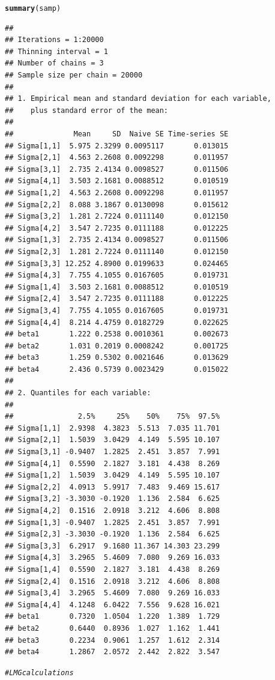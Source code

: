 \documentclass[11pt,a4paper,twoside]{book}\usepackage[]{graphicx}\usepackage[]{color}
\makeatletter
\newcommand{\hlcom}[1]{\textcolor[rgb]{0.678,0.584,0.686}{\textit{#1}}}%
\newcommand{\hlstd}[1]{\textcolor[rgb]{0.345,0.345,0.345}{#1}}%
\newcommand{\hlkwd}[1]{\textcolor[rgb]{0.737,0.353,0.396}{\textbf{#1}}}%
\newenvironment{kframe}{%
 \def\at@end@of@kframe{}%
 \ifinner\ifhmode%
  \def\at@end@of@kframe{\end{minipage}}%
  \begin{minipage}{\columnwidth}%
 \fi\fi%
 \def\FrameCommand##1{\hskip\@totalleftmargin \hskip-\fboxsep
 \colorbox{shadecolor}{##1}\hskip-\fboxsep
     \hskip-\linewidth \hskip-\@totalleftmargin \hskip\columnwidth}%
 \MakeFramed {\advance\hsize-\width
   \@totalleftmargin\z@ \linewidth\hsize
   \@setminipage}}%
 {\par\unskip\endMakeFramed%
 \at@end@of@kframe}
\newenvironment{knitrout}{}{} %
\makeatother
\begin{document}
\begin{knitrout}
\begin{kframe}
\begin{alltt}
\hlkwd{summary}\hlstd{(samp)}
\end{alltt}
\begin{verbatim}
## 
## Iterations = 1:20000
## Thinning interval = 1 
## Number of chains = 3 
## Sample size per chain = 20000 
## 
## 1. Empirical mean and standard deviation for each variable,
##    plus standard error of the mean:
## 
##              Mean     SD  Naive SE Time-series SE
## Sigma[1,1]  5.975 2.3299 0.0095117       0.013015
## Sigma[2,1]  4.563 2.2608 0.0092298       0.011957
## Sigma[3,1]  2.735 2.4134 0.0098527       0.011506
## Sigma[4,1]  3.503 2.1681 0.0088512       0.010519
## Sigma[1,2]  4.563 2.2608 0.0092298       0.011957
## Sigma[2,2]  8.088 3.1867 0.0130098       0.015612
## Sigma[3,2]  1.281 2.7224 0.0111140       0.012150
## Sigma[4,2]  3.547 2.7235 0.0111188       0.012225
## Sigma[1,3]  2.735 2.4134 0.0098527       0.011506
## Sigma[2,3]  1.281 2.7224 0.0111140       0.012150
## Sigma[3,3] 12.252 4.8900 0.0199633       0.024465
## Sigma[4,3]  7.755 4.1055 0.0167605       0.019731
## Sigma[1,4]  3.503 2.1681 0.0088512       0.010519
## Sigma[2,4]  3.547 2.7235 0.0111188       0.012225
## Sigma[3,4]  7.755 4.1055 0.0167605       0.019731
## Sigma[4,4]  8.214 4.4759 0.0182729       0.022625
## beta1       1.222 0.2538 0.0010361       0.002673
## beta2       1.031 0.2019 0.0008242       0.001725
## beta3       1.259 0.5302 0.0021646       0.013629
## beta4       2.436 0.5739 0.0023429       0.015022
## 
## 2. Quantiles for each variable:
## 
##               2.5%     25%    50%    75%  97.5%
## Sigma[1,1]  2.9398  4.3823  5.513  7.035 11.701
## Sigma[2,1]  1.5039  3.0429  4.149  5.595 10.107
## Sigma[3,1] -0.9407  1.2825  2.451  3.857  7.991
## Sigma[4,1]  0.5590  2.1827  3.181  4.438  8.269
## Sigma[1,2]  1.5039  3.0429  4.149  5.595 10.107
## Sigma[2,2]  4.0913  5.9917  7.483  9.469 15.617
## Sigma[3,2] -3.3030 -0.1920  1.136  2.584  6.625
## Sigma[4,2]  0.1516  2.0918  3.212  4.606  8.808
## Sigma[1,3] -0.9407  1.2825  2.451  3.857  7.991
## Sigma[2,3] -3.3030 -0.1920  1.136  2.584  6.625
## Sigma[3,3]  6.2917  9.1680 11.367 14.303 23.299
## Sigma[4,3]  3.2965  5.4609  7.080  9.269 16.033
## Sigma[1,4]  0.5590  2.1827  3.181  4.438  8.269
## Sigma[2,4]  0.1516  2.0918  3.212  4.606  8.808
## Sigma[3,4]  3.2965  5.4609  7.080  9.269 16.033
## Sigma[4,4]  4.1248  6.0422  7.556  9.628 16.021
## beta1       0.7320  1.0504  1.220  1.389  1.729
## beta2       0.6440  0.8936  1.027  1.162  1.441
## beta3       0.2234  0.9061  1.257  1.612  2.314
## beta4       1.2867  2.0572  2.442  2.822  3.547
\end{verbatim}
\begin{alltt}
\hlcom{#LMG calculations}


\end{alltt}
\end{kframe}
\end{knitrout}
\end{document}
